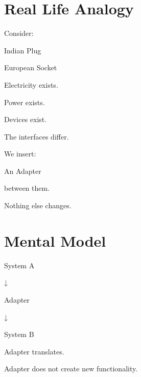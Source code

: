 \documentclass[11pt,a4paper]{book}
\begin{document}
\section{Real Life Analogy}

Consider:


Indian Plug


European Socket


Electricity exists.


Power exists.


Devices exist.


The interfaces differ.


We insert:


An Adapter


between them.


Nothing else changes.


\section{Mental Model}

\begin{mentalmodel}

System A

↓

Adapter

↓

System B


Adapter translates.


Adapter does not create
new functionality.

\end{mentalmodel}
\end{document}
